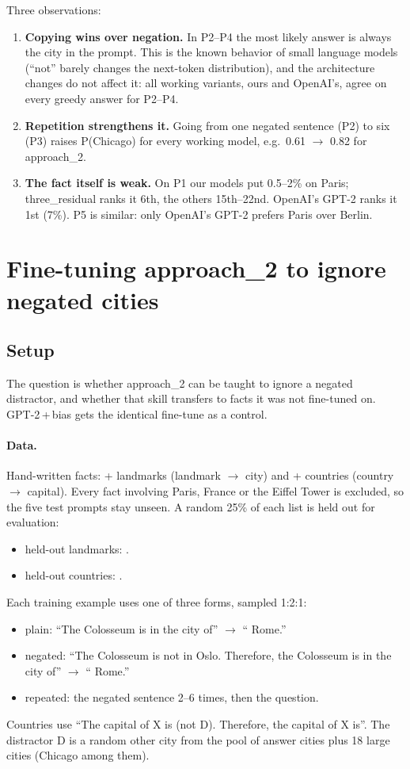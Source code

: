 \documentclass[11pt]{article}
\newcommand{\atwo}{approach\_2}
\newcommand{\base}{GPT-2\,+\,bias}
\begin{document}
Three observations:
\begin{enumerate}
\item \textbf{Copying wins over negation.} In P2--P4 the most likely answer is always the city in the
prompt. This is the known behavior of small language models (``not'' barely changes the next-token
distribution), and the architecture changes do not affect it: all working variants, ours and OpenAI's,
agree on every greedy answer for P2--P4.
\item \textbf{Repetition strengthens it.} Going from one negated sentence (P2) to six (P3) raises
P(Chicago) for every working model, e.g.\ 0.61 $\to$ 0.82 for \atwo{}.
\item \textbf{The fact itself is weak.} On P1 our models put 0.5--2\% on Paris; three\_residual ranks it
6th, the others 15th--22nd. OpenAI's GPT-2 ranks it 1st (7\%). P5 is similar: only OpenAI's GPT-2 prefers
Paris over Berlin.
\end{enumerate}

\section{Fine-tuning approach\_2 to ignore negated cities}

\subsection{Setup}

The question is whether \atwo{} can be taught to ignore a negated distractor, and whether that skill
transfers to facts it was not fine-tuned on. \base{} gets the identical fine-tune as a control.

\paragraph{Data.} Hand-written facts: \NTrainLand{}+\NHeldLand{} landmarks (landmark $\to$ city) and
\NTrainCap{}+\NHeldCap{} countries (country $\to$ capital). Every fact involving Paris, France or the Eiffel
Tower is excluded, so the five test prompts stay unseen. A random 25\% of each list is held out for evaluation:

\begin{itemize}
\item held-out landmarks: \HeldLandList{}.
\item held-out countries: \HeldCapList{}.
\end{itemize}

Each training example uses one of three forms, sampled 1:2:1:
\begin{itemize}
\item plain: ``The Colosseum is in the city of'' $\to$ `` Rome.''
\item negated: ``The Colosseum is not in Oslo. Therefore, the Colosseum is in the city of'' $\to$ `` Rome.''
\item repeated: the negated sentence 2--6 times, then the question.
\end{itemize}
Countries use ``The capital of X is (not D). Therefore, the capital of X is''. The distractor D is a random
other city from the pool of answer cities plus 18 large cities (Chicago among them).
\end{document}
